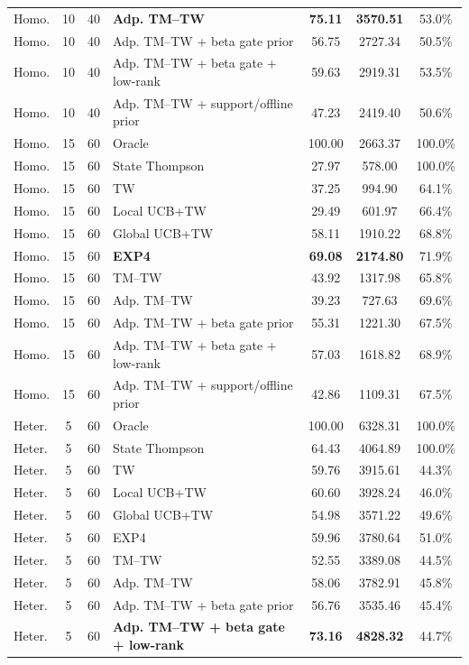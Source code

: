 \begin{table}[t]
{\begin{tabular}{lcclccc}
Homo. & 10 & 40 & \textbf{Adp. TM--TW} & \textbf{75.11} & \textbf{3570.51} & 53.0\% \\
Homo. & 10 & 40 & Adp. TM--TW + beta gate prior & 56.75 & 2727.34 & 50.5\% \\
Homo. & 10 & 40 & Adp. TM--TW + beta gate + low-rank & 59.63 & 2919.31 & 53.5\% \\
Homo. & 10 & 40 & Adp. TM--TW + support/offline prior & 47.23 & 2419.40 & 50.6\% \\
\addlinespace
Homo. & 15 & 60 & Oracle & 100.00 & 2663.37 & 100.0\% \\
Homo. & 15 & 60 & State Thompson & 27.97 & 578.00 & 100.0\% \\
Homo. & 15 & 60 & TW & 37.25 & 994.90 & 64.1\% \\
Homo. & 15 & 60 & Local UCB+TW & 29.49 & 601.97 & 66.4\% \\
Homo. & 15 & 60 & Global UCB+TW & 58.11 & 1910.22 & 68.8\% \\
Homo. & 15 & 60 & \textbf{EXP4} & \textbf{69.08} & \textbf{2174.80} & 71.9\% \\
Homo. & 15 & 60 & TM--TW & 43.92 & 1317.98 & 65.8\% \\
Homo. & 15 & 60 & Adp. TM--TW & 39.23 & 727.63 & 69.6\% \\
Homo. & 15 & 60 & Adp. TM--TW + beta gate prior & 55.31 & 1221.30 & 67.5\% \\
Homo. & 15 & 60 & Adp. TM--TW + beta gate + low-rank & 57.03 & 1618.82 & 68.9\% \\
Homo. & 15 & 60 & Adp. TM--TW + support/offline prior & 42.86 & 1109.31 & 67.5\% \\
\addlinespace
Heter. & 5 & 60 & Oracle & 100.00 & 6328.31 & 100.0\% \\
Heter. & 5 & 60 & State Thompson & 64.43 & 4064.89 & 100.0\% \\
Heter. & 5 & 60 & TW & 59.76 & 3915.61 & 44.3\% \\
Heter. & 5 & 60 & Local UCB+TW & 60.60 & 3928.24 & 46.0\% \\
Heter. & 5 & 60 & Global UCB+TW & 54.98 & 3571.22 & 49.6\% \\
Heter. & 5 & 60 & EXP4 & 59.96 & 3780.64 & 51.0\% \\
Heter. & 5 & 60 & TM--TW & 52.55 & 3389.08 & 44.5\% \\
Heter. & 5 & 60 & Adp. TM--TW & 58.06 & 3782.91 & 45.8\% \\
Heter. & 5 & 60 & Adp. TM--TW + beta gate prior & 56.76 & 3535.46 & 45.4\% \\
Heter. & 5 & 60 & \textbf{Adp. TM--TW + beta gate + low-rank} & \textbf{73.16} & \textbf{4828.32} & 44.7\% \\

\end{tabular}}
\end{table}
